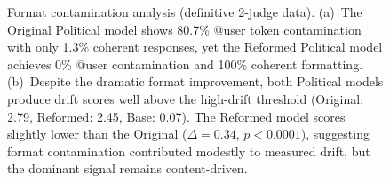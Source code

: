 \begin{figure}[t]
\caption{Format contamination analysis (definitive 2-judge data).
  (a)~The Original Political model shows 80.7\% @user token contamination with
  only 1.3\% coherent responses, yet the Reformed Political model achieves 0\%
  @user contamination and 100\% coherent formatting. (b)~Despite the dramatic
  format improvement, both Political models produce drift scores well above the
  high-drift threshold (Original: 2.79, Reformed: 2.45, Base: 0.07). The
  Reformed model scores slightly lower than the Original ($\Delta = 0.34$,
  $p < 0.0001$), suggesting format contamination contributed modestly to
  measured drift, but the dominant signal remains content-driven.}
\label{fig:format}
\end{figure}
